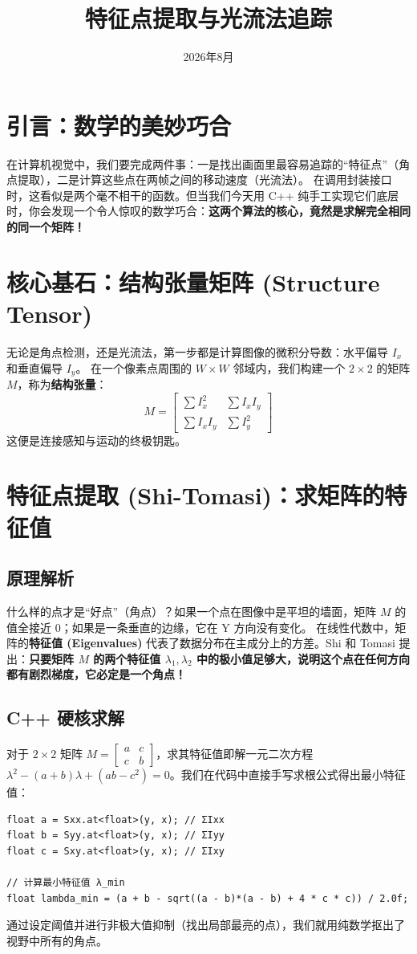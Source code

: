 \documentclass[12pt, a4paper]{ctexart}
\title{\textbf{特征点提取与光流法追踪}}
\date{2026年8月}
\begin{document}
\maketitle

\section{引言：数学的美妙巧合}
在计算机视觉中，我们要完成两件事：一是找出画面里最容易追踪的“特征点”（角点提取），二是计算这些点在两帧之间的移动速度（光流法）。
在调用封装接口时，这看似是两个毫不相干的函数。但当我们今天用 C++ 纯手工实现它们底层时，你会发现一个令人惊叹的数学巧合：\textbf{这两个算法的核心，竟然是求解完全相同的同一个矩阵！}

\section{核心基石：结构张量矩阵 (Structure Tensor)}
无论是角点检测，还是光流法，第一步都是计算图像的微积分导数：水平偏导 $I_x$ 和垂直偏导 $I_y$。
在一个像素点周围的 $W \times W$ 邻域内，我们构建一个 $2 \times 2$ 的矩阵 $M$，称为\textbf{结构张量}：
\begin{equation}
M = 
\begin{bmatrix}
\sum I_x^2 & \sum I_x I_y \\
\sum I_x I_y & \sum I_y^2
\end{bmatrix}
\end{equation}
这便是连接感知与运动的终极钥匙。

\section{特征点提取 (Shi-Tomasi)：求矩阵的特征值}
\subsection{原理解析}
什么样的点才是“好点”（角点）？如果一个点在图像中是平坦的墙面，矩阵 $M$ 的值全接近 $0$；如果是一条垂直的边缘，它在 Y 方向没有变化。
在线性代数中，矩阵的\textbf{特征值 (Eigenvalues)} 代表了数据分布在主成分上的方差。Shi 和 Tomasi 提出：\textbf{只要矩阵 $M$ 的两个特征值 $\lambda_1, \lambda_2$ 中的极小值足够大，说明这个点在任何方向都有剧烈梯度，它必定是一个角点！}

\subsection{C++ 硬核求解}
对于 $2 \times 2$ 矩阵 $M = \begin{bmatrix} a & c \\ c & b \end{bmatrix}$，求其特征值即解一元二次方程 $\lambda^2 - (a+b)\lambda + (ab-c^2) = 0$。我们在代码中直接手写求根公式得出最小特征值：
\begin{lstlisting}
float a = Sxx.at<float>(y, x); // ΣIxx
float b = Syy.at<float>(y, x); // ΣIyy
float c = Sxy.at<float>(y, x); // ΣIxy

// 计算最小特征值 λ_min
float lambda_min = (a + b - sqrt((a - b)*(a - b) + 4 * c * c)) / 2.0f;
\end{lstlisting}
通过设定阈值并进行非极大值抑制（找出局部最亮的点），我们就用纯数学抠出了视野中所有的角点。
\end{document}
